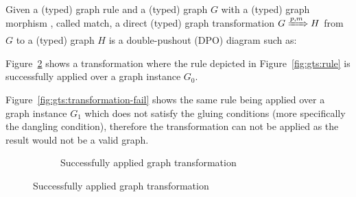 \begin{definition} Given a (typed) graph rule \graphrule{} and a (typed) graph $G$ with a (typed) graph morphism \match, called match, a direct (typed) graph transformation $G \xRightarrow{p,m} H$ from $G$ to a (typed) graph $H$ is a double-pushout (DPO) diagram such as:

\end{definition}

\begin{example} Figure~\ref{fig:gts:transformation-success} shows a transformation where the rule depicted in Figure~\ref{fig:gts:rule} is successfully applied over a graph instance $G_0$.

  Figure~\ref{fig:gts:transformation-fail} shows the same rule being applied over a graph instance $G_1$ which does not satisfy the gluing conditions (more specifically the dangling condition), therefore the transformation can not be applied as the result would not be a valid graph.

\begin{figure}[!ht]
  \centering
  \begin{subfigure}[t]{.5\textwidth}
    \centerline{}
    \caption{Successfully applied graph transformation}\label{fig:gts:transformation-success}
  \end{subfigure}


\end{figure}
\end{example}
